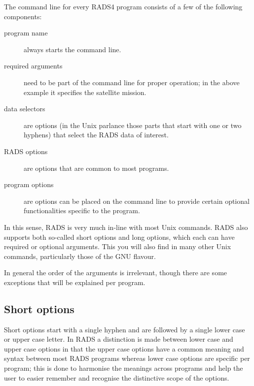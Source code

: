 \documentclass[a4paper,11pt,openany,natbib,nomargin]{thesis}
\begin{document}
The command line for every RADS4 program consists of a few of the following components:
\begin{description}
\item[program name] always starts the command line.
\item[required arguments] need to be part of the command line for proper operation; in the above example it specifies the satellite mission.
\item[data selectors] are options (in the Unix parlance those parts that start with one or two hyphens) that select the RADS data of interest.
\item[RADS options] are options that are common to most programs.
\item[program options] are options can be placed on the command line to provide certain optional functionalities specific to the program.
\end{description}
In this sense, RADS is very much in-line with most Unix commands. RADS also supports both so-called short options and long options, which each can have required or optional arguments. This you will also find in many other Unix commands, particularly those of the GNU flavour.

In general the order of the arguments is irrelevant, though there are some exceptions that will be explained per program.

\subsection{Short options}
Short options start with a single hyphen and are followed by a single lower case or upper case letter. In RADS a distinction is made between lower case and upper case options in that the upper case options have a common meaning and syntax between most RADS programs whereas lower case options are specific per program; this is done to harmonise the meanings across programs and help the user to easier remember and recognise the distinctive scope of the options.
\end{document}
